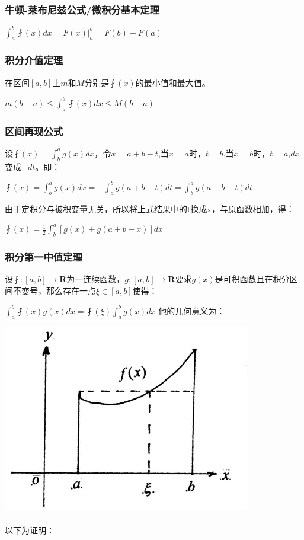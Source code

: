 \documentclass[UTF8]{ctexbook}
\newcommand{\defFunction}[1]{\fint(#1)}
\newcommand{\definiteIntegral}[2]{\int^{#1}_{#2}}
\begin{document}
{{{\subsubsection{牛顿-莱布尼兹公式/微积分基本定理}{
  $\definiteIntegral{b}{a}\defFunction{x}dx = F(x)|^b_a = F(b) - F(a)$
}%

\subsubsection{积分介值定理}{

  在区间$[a,b]$上$m$和$M$分别是$\defFunction{x}$的最小值和最大值。

  $m(b - a) \leq \definiteIntegral{b}{a}\defFunction{x}dx \leq M(b - a)$

}%

\subsubsection{区间再现公式}{
  设$\defFunction{x} = \definiteIntegral{a}{b}g(x)dx$，令$x = a + b - t$,当$x = a$时，$t = b$,当$x = b$时，$t = a$,$dx$变成$-dt$。即：

  $\defFunction{x} = \definiteIntegral{a}{b}g(x)dx = -\definiteIntegral{b}{a}g(a+b-t)dt = \definiteIntegral{a}{b}g(a + b - t)dt$

  由于定积分与被积变量无关，所以将上式结果中的t换成x，与原函数相加，得：

  $\defFunction{x} = \frac{1}{2}\definiteIntegral{a}{b}[g(x) + g(a + b - x)]dx$
}%

\subsubsection{积分第一中值定理}{
设$\fint:[a,b] \to \mathbf{R}$为一连续函数，$g:[a,b] \to \mathbf{R}$要求$g(x)$是可积函数且在积分区间不变号，那么存在一点$\xi\in[a,b]$使得：

$\definiteIntegral{b}{a}\defFunction{x}g(x)dx = \defFunction{\xi}\definiteIntegral{b}{a}g(x)dx$
他的几何意义为：

\includegraphics{resources/Geometric_explanation_of_the_mean_value_theorem_for_integration.jpg}
\\\\
以下为证明：

}}}}
\end{document}
